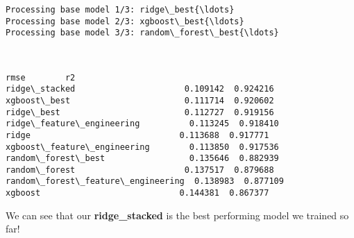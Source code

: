 \documentclass[11pt]{article}
\makeatletter
\newcommand{\boxspacing}{\kern\kvtcb@left@rule\kern\kvtcb@boxsep}
\newcommand{\prompt}[4]{
        {\ttfamily\llap{{\color{#2}[#3]:\hspace{3pt}#4}}\vspace{-\baselineskip}}
    }
\makeatother
\begin{document}
    \begin{Verbatim}[commandchars=\\\{\}]
Processing base model 1/3: ridge\_best{\ldots}
Processing base model 2/3: xgboost\_best{\ldots}
Processing base model 3/3: random\_forest\_best{\ldots}
    \end{Verbatim}

    \begin{center}
    \end{center}
    { \hspace*{\fill} \\}
    
            \begin{tcolorbox}[breakable, size=fbox, boxrule=.5pt, pad at break*=1mm, opacityfill=0]
\prompt{Out}{outcolor}{40}{\boxspacing}
\begin{Verbatim}[commandchars=\\\{\}]
                                       rmse        r2
ridge\_stacked                      0.109142  0.924216
xgboost\_best                       0.111714  0.920602
ridge\_best                         0.112727  0.919156
ridge\_feature\_engineering          0.113245  0.918410
ridge                              0.113688  0.917771
xgboost\_feature\_engineering        0.113850  0.917536
random\_forest\_best                 0.135646  0.882939
random\_forest                      0.137517  0.879688
random\_forest\_feature\_engineering  0.138983  0.877109
xgboost                            0.144381  0.867377
\end{Verbatim}
\end{tcolorbox}
        
    We can see that our \textbf{ridge\_stacked} is the best performing model
we trained so far!
\end{document}
